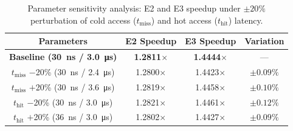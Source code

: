 \documentclass[conference]{IEEEtran}
\begin{document}
\begin{table}[t]
\caption{Parameter sensitivity analysis: E2 and E3 speedup under $\pm20\%$ perturbation of cold access ($t_{\text{miss}}$) and hot access ($t_{\text{hit}}$) latency.}
\label{tab:sensitivity}
\begin{center}
\begin{tabular}{cccc}
\toprule
\textbf{Parameters} & \textbf{E2 Speedup} & \textbf{E3 Speedup} & \textbf{Variation} \\
\midrule
\textbf{Baseline (\qty{30}{\nano\second} / \qty{3.0}{\micro\second})} & \textbf{1.2811$\times$} & \textbf{1.4444$\times$} & --- \\
$t_{\text{miss}}$ $-$20\% (\qty{30}{\nano\second} / \qty{2.4}{\micro\second}) & 1.2800$\times$ & 1.4423$\times$ & $\pm0.09\%$ \\
$t_{\text{miss}}$ $+$20\% (\qty{30}{\nano\second} / \qty{3.6}{\micro\second}) & 1.2819$\times$ & 1.4458$\times$ & $\pm0.10\%$ \\
$t_{\text{hit}}$ $-$20\% (\qty{30}{\nano\second} / \qty{3.0}{\micro\second}) & 1.2821$\times$ & 1.4461$\times$ & $\pm0.12\%$ \\
$t_{\text{hit}}$ $+$20\% (\qty{36}{\nano\second} / \qty{3.0}{\micro\second}) & 1.2802$\times$ & 1.4427$\times$ & $\pm0.09\%$ \\
\bottomrule
\end{tabular}
\end{center}
\end{table}





\end{document}
